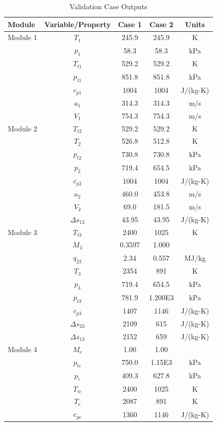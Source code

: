 \documentclass[conf]{new-aiaa} %
\begin{document}
\begin{longtable}[c]{lcccc} %
    \caption{\label{tab:val_case_output} Validation Case Outputs}\\
    \hline
    Module& Variable/Property& Case 1& Case 2& Units\\\hline
    \endfirsthead
    Module 1& $T_1$& 245.9& 245.9& K\\
    & $p_1$& 58.3& 58.3& kPa\\
    & $T_{t1}$& 529.2& 529.2& K\\
    & $p_{t1}$& 851.8& 851.8& kPa\\
    & $c_{p1}$& 1004& 1004& J/(kg-K)\\
    & $a_1$& 314.3& 314.3& m/s\\
    & $V_1$& 754.3& 754.3& m/s\\\hline
    Module 2& $T_{t2}$& 529.2& 529.2& K\\
    & $T_2$& 526.8& 512.8& K\\
    & $p_{t2}$& 730.8& 730.8& kPa\\
    & $p_2$& 719.4& 654.5& kPa\\
    & $c_{p2}$& 1004& 1004& J/(kg-K)\\
    & $a_2$& 460.0& 453.8& m/s\\
    & $V_2$& 69.0& 181.5& m/s\\
    & $\Delta s_{12}$& 43.95& 43.95& J/(kg-K)\\\hline
    Module 3& $T_{t3}$& 2400& 1025& K\\
    & $M_3$& 0.3597& 1.000\\
    & $q_{23}$& 2.34& 0.557& MJ/kg\\
    & $T_3$& 2354& 891& K\\
    & $p_3$& 719.4& 654.5& kPa\\
    & $p_{t3}$& 781.9& 1.200E3& kPa\\
    & $c_{p3}$& 1407& 1146& J/(kg-K)\\
    & $\Delta s_{23}$& 2109& 615& J/(kg-K)\\
    & $\Delta s_{13}$& 2152& 659& J/(kg-K)\\\hline
    Module 4& $M_e$& 1.00& 1.00\\
    & $p_{te}$& 750.0& 1.15E3& kPa\\
    & $p_e$& 409.3& 627.8& kPa\\
    & $T_{te}$& 2400& 1025& K\\
    & $T_e$& 2087& 891& K\\
    & $c_{pe}$& 1360& 1146& J/(kg-K)\\

\end{longtable}
\end{document}
